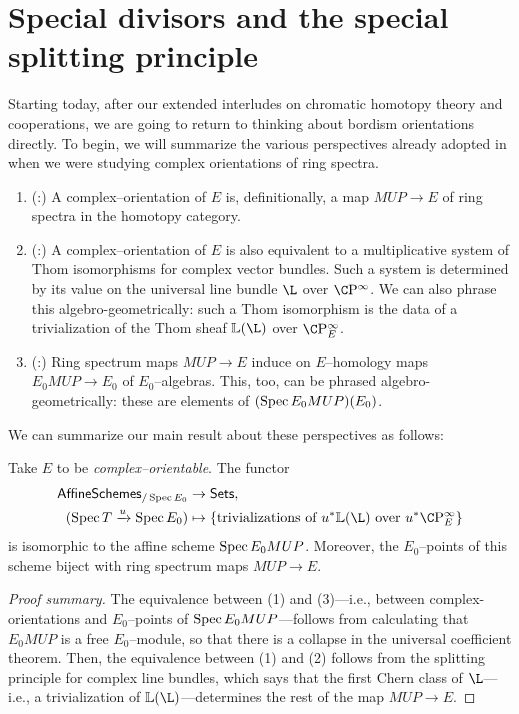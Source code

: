 \section{Special divisors and the special splitting principle}\label{MSUDay}

Starting today, after our extended interludes on chromatic homotopy theory and cooperations, we are going to return to thinking about bordism orientations directly.  To begin, we will summarize the various perspectives already adopted in  when we were studying complex orientations of ring spectra.
\begin{enumerate}
\item (:) A complex--orientation of $E$ is, definitionally, a map $MUP \to E$ of ring spectra in the homotopy category.
\item (:) A complex--orientation of $E$ is also equivalent to a multiplicative system of Thom isomorphisms for complex vector bundles.  Such a system is determined by its value on the universal line bundle $\L$ over $\CP^\infty$.  We can also phrase this algebro-geometrically: such a Thom isomorphism is the data of a trivialization of the Thom sheaf $\ThomSheaf{\L}$ over $\CP^\infty_E$.
\item (:) Ring spectrum maps $MUP \to E$ induce on $E$--homology maps $E_0 MUP \to E_0$ of $E_0$--algebras.  This, too, can be phrased algebro-geometrically: these are elements of $(\operatorname{Spec} E_0 MUP)(E_0)$.
\end{enumerate}
We can summarize our main result about these perspectives as follows:
\begin{theorem}\label{BUZTriumvirate}
Take $E$ to be \emph{complex--orientable}.  The functor
\begin{align*}
\CatOf{AffineSchemes}_{/\Spec E_0} & \to \CatOf{Sets}, \\
(\Spec T \xrightarrow{u} \Spec E_0) & \mapsto \left\{ \text{trivializations of $u^* \ThomSheaf{\L}$ over $u^* \CP^\infty_E$} \right\}
\end{align*}
is isomorphic to the affine scheme $\operatorname{Spec} E_0 MUP$.  Moreover, the $E_0$--points of this scheme biject with ring spectrum maps $MUP \to E$.
\end{theorem}
\begin{proof}[Proof summary]
The equivalence between (1) and (3)---i.e., between complex-orientations and $E_0$--points of $\operatorname{Spec} E_0 MUP$---follows from calculating that $E_0 MUP$ is a free $E_0$--module, so that there is a collapse in the universal coefficient theorem.  Then, the equivalence between (1) and (2) follows from the splitting principle for complex line bundles, which says that the first Chern class of $\L$---i.e., a trivialization of $\ThomSheaf{\L}$---determines the rest of the map $MUP \to E$.
\end{proof}

